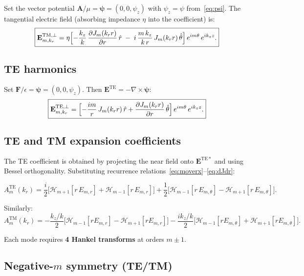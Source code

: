 \documentclass[11pt,a4paper]{article}
\newcommand{\rhat}{\hat{r}}
\newcommand{\that}{\hat{\theta}}
\newcommand{\HT}{\mathcal{H}}
\newcommand{\E}{\mathbf{E}}
\newcommand{\A}{\mathbf{A}}
\newcommand{\F}{\mathbf{F}}
\newcommand{\bpsi}{\boldsymbol{\psi}}
\begin{document}
Set the vector potential $\A/\mu = \bpsi = (0,0,\psi_z)$ with $\psi_z = \psi$ from~\eqref{eq:psi}.
The tangential electric field (absorbing impedance $\eta$ into the coefficient) is:
\begin{equation}\label{eq:ETM_tang}
\boxed{
  \E^{\mathrm{TM},\perp}_{m,k_r}
  = \eta\Bigl[
    -\frac{k_z}{k}\,\frac{\partial J_m(k_r r)}{\partial r}\,\rhat
    \;-\; i\,\frac{m\,k_z}{k\,r}\,J_m(k_r r)\,\that
  \Bigr]\,e^{im\theta}\,e^{ik_z z}.
}
\end{equation}


\subsection{TE harmonics}

Set $\F/\epsilon = \bpsi = (0,0,\psi_z)$.  Then $\E^{\mathrm{TE}} = -\nabla\times\bpsi$:
\begin{equation}\label{eq:ETE_tang}
\boxed{
  \E^{\mathrm{TE},\perp}_{m,k_r}
  = \Bigl[
    -\frac{im}{r}\,J_m(k_r r)\,\rhat
    + \frac{\partial J_m(k_r r)}{\partial r}\,\that
  \Bigr]\,e^{im\theta}\,e^{ik_z z}.
}
\end{equation}


\subsection{TE and TM expansion coefficients}

The TE coefficient is obtained by projecting the near field onto $\E^{\mathrm{TE}*}$
and using Bessel orthogonality.  Substituting recurrence
relations~\eqref{eq:moverx}--\eqref{eq:dJdr}:

\begin{equation}\label{eq:ATE}
  A^{\mathrm{TE}}_m(k_r)
  = \frac{i}{2}\bigl[\HT_{m+1}[r\,E_{m,r}] + \HT_{m-1}[r\,E_{m,r}]\bigr]
  + \frac{1}{2}\bigl[\HT_{m-1}[r\,E_{m,\theta}] - \HT_{m+1}[r\,E_{m,\theta}]\bigr].
\end{equation}

Similarly:
\begin{equation}\label{eq:ATM}
  A^{\mathrm{TM}}_m(k_r)
  = -\frac{k_z/k}{2}\bigl[\HT_{m-1}[rE_{m,r}] - \HT_{m+1}[rE_{m,r}]\bigr]
  - \frac{ik_z/k}{2}\bigl[\HT_{m-1}[rE_{m,\theta}] + \HT_{m+1}[rE_{m,\theta}]\bigr].
\end{equation}

Each mode requires \textbf{4 Hankel transforms} at orders $m\pm 1$.


\subsection{Negative-$m$ symmetry (TE/TM)}
\end{document}
